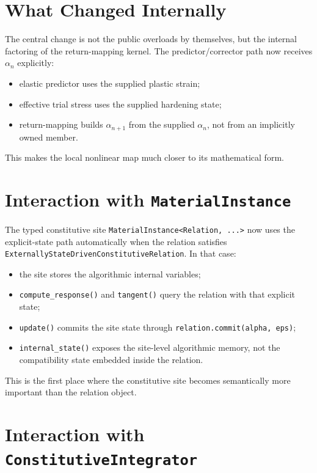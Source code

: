 \section{What Changed Internally}

The central change is not the public overloads by themselves, but the internal
factoring of the return-mapping kernel.  The predictor/corrector path now
receives \(\alpha_n\) explicitly:

\begin{itemize}
  \item elastic predictor uses the supplied plastic strain;
  \item effective trial stress uses the supplied hardening state;
  \item return-mapping builds \(\alpha_{n+1}\) from the supplied
        \(\alpha_n\), not from an implicitly owned member.
\end{itemize}

This makes the local nonlinear map much closer to its mathematical form.

\section{Interaction with \texttt{MaterialInstance}}

The typed constitutive site \texttt{MaterialInstance<Relation, ...>} now uses
the explicit-state path automatically when the relation satisfies
\texttt{ExternallyStateDrivenConstitutiveRelation}.  In that case:

\begin{itemize}
  \item the site stores the algorithmic internal variables;
  \item \texttt{compute\_response()} and \texttt{tangent()} query the relation
        with that explicit state;
  \item \texttt{update()} commits the site state through
        \texttt{relation.commit(alpha, eps)};
  \item \texttt{internal\_state()} exposes the site-level algorithmic memory,
        not the compatibility state embedded inside the relation.
\end{itemize}

This is the first place where the constitutive site becomes semantically more
important than the relation object.

\section{Interaction with \texttt{ConstitutiveIntegrator}}

